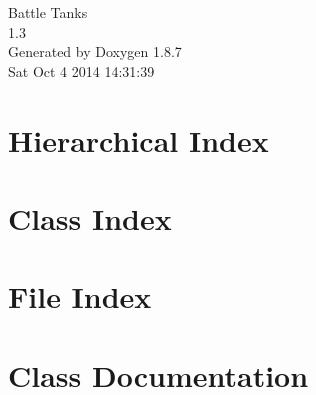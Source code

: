 \documentclass[twoside]{book}
\newcommand{\+}{\discretionary{\mbox{\scriptsize$\hookleftarrow$}}{}{}}
\newcommand{\clearemptydoublepage}{%
  \newpage{\pagestyle{empty}\cleardoublepage}%
}
\begin{document}
\hypersetup{pageanchor=false,
             bookmarks=true,
             bookmarksnumbered=true,
             pdfencoding=unicode
            }
\begin{titlepage}
\vspace*{7cm}
\begin{center}%
{\Large Battle Tanks \\[1ex]\large 1.\+3 }\\
\vspace*{1cm}
{\large Generated by Doxygen 1.8.7}\\
\vspace*{0.5cm}
{\small Sat Oct 4 2014 14:31:39}\\
\end{center}
\end{titlepage}
\clearemptydoublepage
\tableofcontents
\clearemptydoublepage
{}
\hypersetup{pageanchor=true}

\chapter{Hierarchical Index}

\chapter{Class Index}

\chapter{File Index}

\chapter{Class Documentation}












































\end{document}
